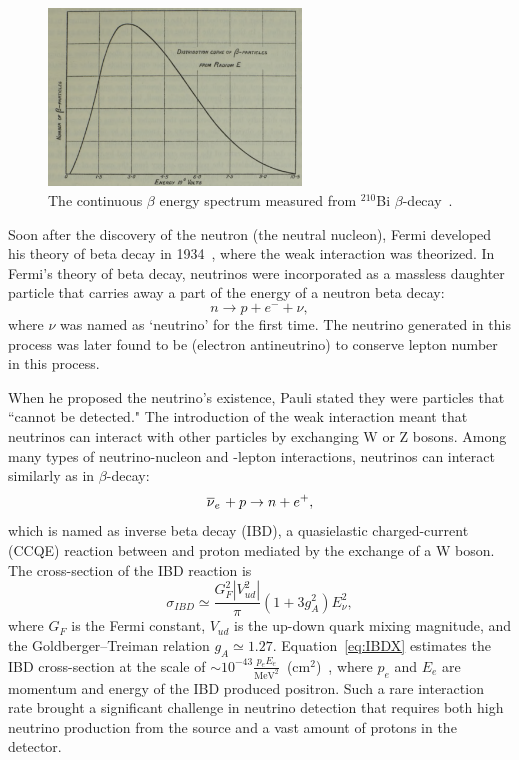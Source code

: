 \begin{figure}[h!]
\centering
\includegraphics[width=0.6\textwidth]{Figures/BiSpectrum.png}
\caption[The continuous $\beta$ spectrum of $^{210}$Bi]{The continuous $\beta$ energy spectrum measured from $^{210}$Bi $\beta$-decay~\cite{bib:EandW}.}
\label{fig:BiSpectrum}
\end{figure}    
    
    Soon after the discovery of the neutron (the neutral nucleon), Fermi developed his theory of beta decay in 1934~\cite{bib:Fermi}, where the weak interaction was theorized. 
    In Fermi's theory of beta decay, neutrinos were incorporated as a massless daughter particle that carries away a part of the energy of a neutron beta decay:
    \begin{equation}\label{eq1.1}
        n \rightarrow p + e^- + \nu,
    \end{equation}
    where $\nu$ was named as `neutrino' for the first time.
    The neutrino generated in this process was later found to be \nuebar (electron antineutrino) to conserve lepton number in this process.

\label{Ch1Sec2}

    When he proposed the neutrino's existence, Pauli stated they were particles that ``cannot be detected."
    The introduction of the weak interaction meant that neutrinos can interact with other particles by exchanging W or Z bosons.
    Among many types of neutrino-nucleon and -lepton interactions, neutrinos can interact similarly as in $\beta$-decay:
    \begin{equation}
        \label{eq:IBD}
        \overline{\nu }_{e}\hspace{1pt} + p \rightarrow n + e^+,
    \end{equation}
    which is named as inverse beta decay (IBD), a quasielastic charged-current (CCQE) reaction between \nuebar and proton mediated by the exchange of a W boson.
    The cross-section of the IBD reaction is
    \begin{equation}
    \label{eq:IBDX}
    \sigma_{IBD} \simeq \frac{G_F^2|V_{ud}^2|}{\pi} (1+3g_A^2)E_\nu^2,
    \end{equation}
    where $G_F$ is the Fermi constant, $V_{ud}$ is the up-down quark mixing magnitude, and the Goldberger–Treiman relation $g_A \simeq 1.27$.
     Equation~\ref{eq:IBDX} estimates the IBD cross-section at the scale of $\sim 10^{-43}\frac{p_eE_e}{\text{MeV}^2}$~(cm$^2$)~\cite{bib:IBDXsection}, where $p_e$ and $E_e$ are momentum and energy of the IBD produced positron.
    Such a rare interaction rate brought a significant challenge in neutrino detection that requires both high neutrino production from the source and a vast amount of protons in the detector.
    
